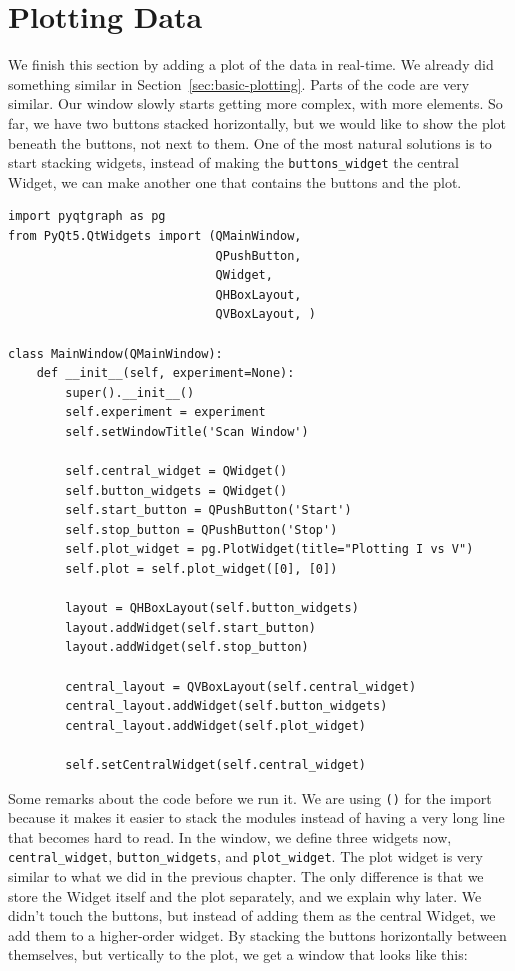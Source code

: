 

\section{Plotting Data}\label{sec:plotting-data}
We finish this section by adding a plot of the data in real-time. We already did something similar in Section~\ref{sec:basic-plotting}. Parts of the code are very similar. Our window slowly starts getting more complex, with more elements. So far, we have two buttons stacked horizontally, but we would like to show the plot beneath the buttons, not next to them. One of the most natural solutions is to start stacking widgets, instead of making the \texttt{buttons\_widget} the central Widget, we can make another one that contains the buttons and the plot.

\begin{verbatim}
import pyqtgraph as pg
from PyQt5.QtWidgets import (QMainWindow,
                             QPushButton,
                             QWidget,
                             QHBoxLayout,
                             QVBoxLayout, )

class MainWindow(QMainWindow):
    def __init__(self, experiment=None):
        super().__init__()
        self.experiment = experiment
        self.setWindowTitle('Scan Window')

        self.central_widget = QWidget()
        self.button_widgets = QWidget()
        self.start_button = QPushButton('Start')
        self.stop_button = QPushButton('Stop')
        self.plot_widget = pg.PlotWidget(title="Plotting I vs V")
        self.plot = self.plot_widget([0], [0])

        layout = QHBoxLayout(self.button_widgets)
        layout.addWidget(self.start_button)
        layout.addWidget(self.stop_button)

        central_layout = QVBoxLayout(self.central_widget)
        central_layout.addWidget(self.button_widgets)
        central_layout.addWidget(self.plot_widget)

        self.setCentralWidget(self.central_widget)
\end{verbatim}

Some remarks about the code before we run it. We are using \texttt{()} for the import because it makes it easier to stack the modules instead of having a very long line that becomes hard to read. In the window, we define three widgets now, \texttt{central\_widget}, \texttt{button\_widgets}, and \texttt{plot\_widget}. The plot widget is very similar to what we did in the previous chapter. The only difference is that we store the Widget itself and the plot separately, and we explain why later. We didn't touch the buttons, but instead of adding them as the central Widget, we add them to a higher-order widget. By stacking the buttons horizontally between themselves, but vertically to the plot, we get a window that looks like this:

